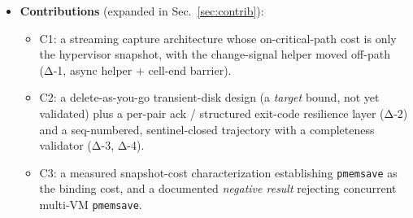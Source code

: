 \documentclass[conference]{IEEEtran}
\begin{document}
\begin{itemize}
        Plan~05 snapshot-throughput proposal.
  \item \textbf{Contributions} (expanded in Sec.~\ref{sec:contrib}):
    \begin{itemize}
      \item C1: a streaming capture architecture whose on-critical-path cost is
            only the hypervisor snapshot, with the change-signal helper moved
            off-path (Δ-1, async helper + cell-end barrier).
      \item C2: a delete-as-you-go transient-disk design (a \emph{target}
            bound, not yet validated) plus a per-pair ack / structured
            exit-code resilience layer (Δ-2) and a seq-numbered, sentinel-closed
            trajectory with a completeness validator (Δ-3, Δ-4).
      \item C3: a measured snapshot-cost characterization establishing
            \texttt{pmemsave} as the binding cost, and a documented
            \emph{negative result} rejecting concurrent multi-VM
            \texttt{pmemsave}.
    \end{itemize}
\end{itemize}

\end{document}
